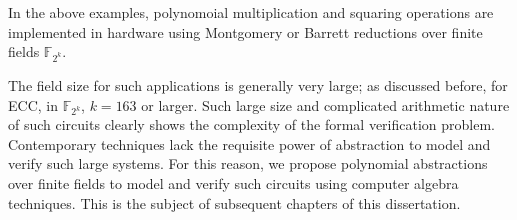 In the above examples, polynomoial multiplication and squaring operations are implemented 
in hardware using Montgomery or Barrett reductions over finite fields $\mathbb{F}_{2^k}$. 

The field size for such applications is generally very large; as discussed before, for ECC, in $\mathbb{F}_{2^k}$, $k=163$ or larger.  
Such large size and complicated arithmetic nature of such circuits clearly shows the complexity of the formal verification problem.
Contemporary techniques lack the requisite power of abstraction to model and verify such large systems. 
For this reason,  we propose polynomial abstractions over finite fields to model
and verify such circuits using computer algebra techniques.
This is the subject of subsequent chapters of this dissertation.




   





